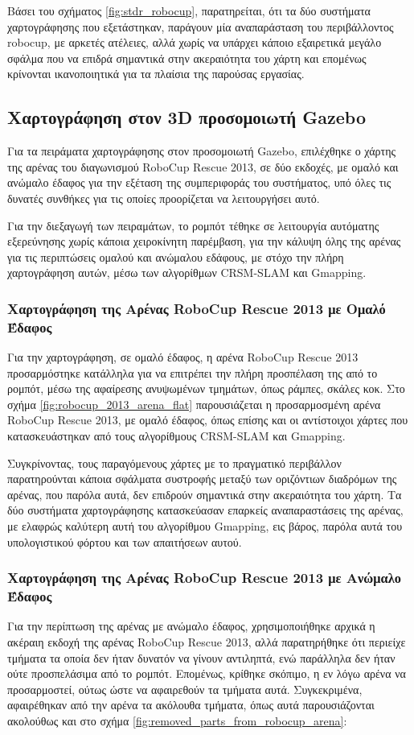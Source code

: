 \bigskip
Βάσει του σχήματος \ref{fig:stdr_robocup}, παρατηρείται, ότι τα δύο συστήματα χαρτογράφησης που εξετάστηκαν, παράγουν μία αναπαράσταση του περιβάλλοντος robocup, με αρκετές ατέλειες, αλλά χωρίς να υπάρχει κάποιο εξαιρετικά μεγάλο σφάλμα που να επιδρά σημαντικά στην ακεραιότητα του χάρτη και επομένως κρίνονται ικανοποιητικά για τα πλαίσια της παρούσας εργασίας.

\subsection{Χαρτογράφηση στον 3D προσομοιωτή Gazebo} \label{ssec:gazebo_slam}
Για τα πειράματα χαρτογράφησης στον προσομοιωτή Gazebo, επιλέχθηκε ο χάρτης της αρένας του διαγωνισμού RoboCup Rescue 2013, σε δύο εκδοχές, με ομαλό και ανώμαλο έδαφος για την εξέταση της συμπεριφοράς του συστήματος, υπό όλες τις δυνατές συνθήκες για τις οποίες προορίζεται να λειτουργήσει αυτό.

\bigskip
Για την διεξαγωγή των πειραμάτων, το ρομπότ τέθηκε σε λειτουργία αυτόματης εξερεύνησης χωρίς κάποια χειροκίνητη παρέμβαση, για την κάλυψη όλης της αρένας για τις περιπτώσεις ομαλού και ανώμαλου εδάφους, με στόχο την πλήρη χαρτογράφηση αυτών, μέσω των αλγορίθμων CRSM-SLAM και Gmapping.

\subsubsection{Χαρτογράφηση της Αρένας RoboCup Rescue 2013 με Ομαλό Έδαφος}
Για την χαρτογράφηση, σε ομαλό έδαφος, η αρένα RoboCup Rescue 2013 προσαρμόστηκε κατάλληλα για να επιτρέπει την πλήρη προσπέλαση της από το ρομπότ, μέσω της αφαίρεσης ανυψωμένων τμημάτων, όπως ράμπες, σκάλες κοκ. Στο σχήμα \ref{fig:robocup_2013_arena_flat} παρουσιάζεται η προσαρμοσμένη αρένα RoboCup Rescue 2013, με ομαλό έδαφος, όπως επίσης και οι αντίστοιχοι χάρτες που κατασκευάστηκαν από τους αλγορίθμους CRSM-SLAM και Gmapping.

\bigskip
Συγκρίνοντας, τους παραγόμενους χάρτες με το πραγματικό περιβάλλον παρατηρούνται κάποια σφάλματα συστροφής μεταξύ των οριζόντιων διαδρόμων της αρένας, που παρόλα αυτά, δεν επιδρούν σημαντικά στην ακεραιότητα του χάρτη. Τα δύο συστήματα χαρτογράφησης κατασκεύασαν επαρκείς αναπαραστάσεις της αρένας, με ελαφρώς καλύτερη αυτή του αλγορίθμου Gmapping, εις βάρος, παρόλα αυτά του υπολογιστικού φόρτου και των απαιτήσεων αυτού. 

\subsubsection{Χαρτογράφηση της Αρένας RoboCup Rescue 2013 με Ανώμαλο Έδαφος}
Για την περίπτωση της αρένας με ανώμαλο έδαφος, χρησιμοποιήθηκε αρχικά η ακέραιη εκδοχή της αρένας RoboCup Rescue 2013, αλλά παρατηρήθηκε ότι περιείχε τμήματα τα οποία δεν ήταν δυνατόν να γίνουν αντιληπτά, ενώ παράλληλα δεν ήταν ούτε προσπελάσιμα από το ρομπότ. Επομένως, κρίθηκε σκόπιμο, η εν λόγω αρένα να προσαρμοστεί, ούτως ώστε να αφαιρεθούν τα τμήματα αυτά. Συγκεκριμένα, αφαιρέθηκαν από την αρένα τα ακόλουθα τμήματα, όπως αυτά παρουσιάζονται ακολούθως και στο σχήμα \ref{fig:removed_parts_from_robocup_arena}:

